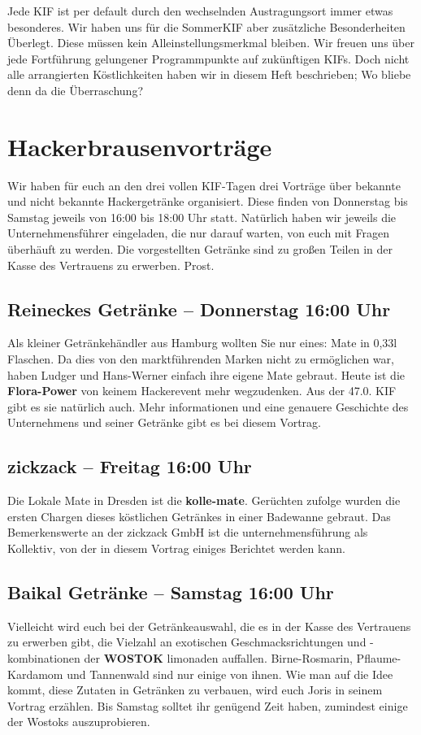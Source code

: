 
Jede KIF ist per default durch den wechselnden Austragungsort immer etwas besonderes. Wir haben uns
für die SommerKIF aber zusätzliche Besonderheiten Überlegt. Diese müssen kein Alleinstellungsmerkmal
bleiben. Wir freuen uns über jede Fortführung gelungener Programmpunkte auf zukünftigen KIFs. Doch
nicht alle arrangierten Köstlichkeiten haben wir in diesem Heft beschrieben; Wo bliebe denn da die
Überraschung?

\section*{Hackerbrausenvorträge}
Wir haben für euch an den drei vollen KIF-Tagen drei Vorträge über bekannte und nicht bekannte
Hackergetränke organisiert. Diese finden von Donnerstag bis Samstag jeweils von 16:00 bis 18:00 Uhr
statt. Natürlich haben wir jeweils die Unternehmensführer eingeladen, die nur darauf warten, von
euch mit Fragen überhäuft zu werden. Die vorgestellten Getränke sind zu großen Teilen in der Kasse
des Vertrauens zu erwerben. Prost.

\subsection*{Reineckes Getränke -- Donnerstag 16:00 Uhr}
Als kleiner Getränkehändler aus Hamburg wollten Sie nur eines: Mate in 0,33l Flaschen. Da dies von
den marktführenden Marken nicht zu ermöglichen war, haben Ludger und Hans-Werner einfach ihre eigene
Mate gebraut. Heute ist die \textbf{Flora-Power} von keinem Hackerevent mehr wegzudenken. Aus der
47.0. KIF gibt es sie natürlich auch. Mehr informationen und eine genauere Geschichte des
Unternehmens und seiner Getränke gibt es bei diesem Vortrag.

\subsection*{zickzack -- Freitag 16:00 Uhr}
Die Lokale Mate in Dresden ist die \textbf{kolle-mate}. Gerüchten zufolge wurden die ersten Chargen
dieses köstlichen Getränkes in einer Badewanne gebraut. Das Bemerkenswerte an der zickzack GmbH ist
die unternehmensführung als Kollektiv, von der in diesem Vortrag einiges Berichtet werden kann.

\subsection*{Baikal Getränke -- Samstag 16:00 Uhr}
Vielleicht wird euch bei der Getränkeauswahl, die es in der Kasse des Vertrauens zu erwerben gibt,
die Vielzahl an exotischen Geschmacksrichtungen und -kombinationen der \textbf{WOSTOK} limonaden
auffallen. Birne-Rosmarin, Pflaume-Kardamom und Tannenwald sind nur einige von ihnen. Wie man auf
die Idee kommt, diese Zutaten in Getränken zu verbauen, wird euch Joris in seinem Vortrag erzählen.
Bis Samstag solltet ihr genügend Zeit haben, zumindest einige der Wostoks auszuprobieren.


